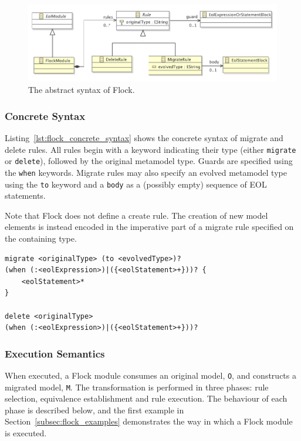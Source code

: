 \begin{figure}
  \centering
  \includegraphics[scale=0.75]{5.Implementation/flock_abstract_syntax.pdf}
  \caption{The abstract syntax of Flock.}
  \label{fig:abstract_syntax}
\end{figure}

\subsubsection{Concrete Syntax}
\label{subsubsec:concrete_syntax}

Listing~\ref{lst:flock_concrete_syntax} shows the concrete syntax of migrate and delete rules. All rules begin with a keyword indicating their type (either \texttt{migrate} or \texttt{delete}), followed by the original metamodel type. Guards are specified using the \texttt{when} keywords. Migrate rules may also specify an evolved metamodel type using the \texttt{to} keyword and a \texttt{body} as a (possibly empty) sequence of EOL statements.

Note that Flock does not define a create rule. The creation of new model elements is instead encoded in the imperative part of a migrate rule specified on the containing type.

\begin{lstlisting}[float=tbp, caption=Concrete syntax of migrate and delete rules., label=lst:flock_concrete_syntax, language=Flock]
migrate <originalType> (to <evolvedType>)?
(when (:<eolExpression>)|({<eolStatement>+}))? {
	<eolStatement>*
} 

delete <originalType>
(when (:<eolExpression>)|({<eolStatement>+}))?
\end{lstlisting}

\subsubsection{Execution Semantics}
\label{subsubsec:execution_semantics}
When executed, a Flock module consumes an original model, \texttt{O}, and constructs a migrated model, \texttt{M}. The transformation is performed in three phases: rule selection, equivalence establishment and rule execution. The behaviour of each phase is described below, and the first example in Section~\ref{subsec:flock_examples} demonstrates the way in which a Flock module is executed.

